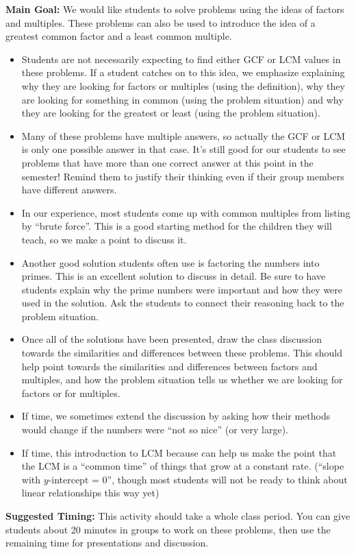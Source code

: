\documentclass[nooutcomes, noauthor, handout]{ximera}
\begin{document}
\newpage
\begin{instructorNotes}

{\bf Main Goal:} We would like students to solve problems using the ideas of factors and multiples. These problems can also be used to introduce the idea of a greatest common factor and a least common multiple.

\begin{itemize}
	\item Students are not necessarily expecting to find either GCF or LCM values in these problems. If a student catches on to this idea, we emphasize explaining why they are looking for factors or multiples (using the definition), why they are looking for something in common (using the problem situation) and why they are looking for the greatest or least (using the problem situation).
	\item Many of these problems have multiple answers, so actually the GCF or LCM is only one possible answer in that case. It's still good for our students to see problems that have more than one correct answer at this point in the semester! Remind them to justify their thinking even if their group members have different answers.
	\item In our experience, most students come up with common multiples from listing by ``brute force''. This is a good starting method for the children they will teach, so we make a point to discuss it.
	\item Another good solution students often use is factoring the numbers into primes. This is an excellent solution to discuss in detail. Be sure to have students explain why the prime numbers were important and how they were used in the solution. Ask the students to connect their reasoning back to the problem situation.
	\item Once all of the solutions have been presented, draw the class discussion towards the similarities and differences between these problems. This should help point towards the similarities and differences between factors and multiples, and how the problem situation tells us whether we are looking for factors or for multiples.
	\item If time, we sometimes extend the discussion by asking how their methods would change if the numbers were ``not so nice'' (or very large).
	\item If time, this introduction to LCM because can help us make the point that the LCM is a ``common time'' of things that grow at a constant rate. (``slope with $y$-intercept = 0'', though most students will not be ready to think about linear relationships this way yet)
\end{itemize}

{\bf Suggested Timing:} This activity should take a whole class period. You can give students about 20 minutes in groups to work on these problems, then use the remaining time for presentations and discussion.
\end{instructorNotes}
\end{document}
